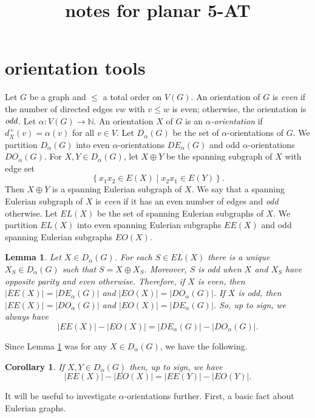 \documentclass[12pt]{article}
\theoremstyle{plain}
\newtheorem{lem}[thm]{Lemma}
\newtheorem{cor}[thm]{Corollary}
\theoremstyle{definition}
\theoremstyle{remark}
\newcommand{\IN}{\mathbb{N}}
\newcommand{\setb}[3]{\left\{ #1 \in #2 \mid #3 \right\}}
\newcommand{\func}[3]{#1\colon #2 \rightarrow #3}
\begin{document}
\title{notes for planar 5-AT}
\author{}
\maketitle

\section{orientation tools}
Let $G$ be a graph and $\le$ a total order on $V(G)$.  
An orientation of $G$ is \emph{even} if the number of directed edges $vw$ with $v \le w$ is even; otherwise, the orientation is $\emph{odd}$.
Let $\func{\alpha}{V(G)}{\IN}$.  An orientation $X$ of $G$ is an \emph{$\alpha$-orientation} if $d_X^+(v) = \alpha(v)$ for all $v \in V$.  Let $D_\alpha(G)$ be the set
of $\alpha$-orientations of $G$.  We partition $D_\alpha(G)$ into even $\alpha$-orientations $DE_\alpha(G)$ and odd $\alpha$-orientations $DO_\alpha(G)$.  
For $X, Y \in D_\alpha(G)$, let $X \oplus Y$ be the spanning subgraph of $X$ with edge set 
\[\setb{x_1x_2}{E(X)}{x_2x_1 \in E(Y)}.\]
Then $X \oplus Y$ is a spanning Eulerian subgraph of $X$.  We say that a spanning Eulerian subgraph of $X$ is \emph{even} if it has an even number of edges and \emph{odd} otherwise.  
Let $EL(X)$ be the set of spanning Eulerian subgraphs of $X$.  We partition $EL(X)$ into even spanning Eulerian subgraphs $EE(X)$ and odd spanning Eulerian subgraphs $EO(X)$.  

\begin{lem}\label{EulerianDifferenceIsEvenOddDifference}
	Let $X \in D_\alpha(G)$.  For each $S \in EL(X)$ there is a unique $X_S \in D_\alpha(G)$ such that $S = X \oplus X_S$.  Moreover, $S$ is odd when $X$ and $X_S$ have opposite parity and even otherwise.
	Therefore, if $X$ is even, then $|EE(X)| = |DE_\alpha(G)|$ and $|EO(X)| = |DO_\alpha(G)|$.  If $X$ is odd, then $|EE(X)| = |DO_\alpha(G)|$ and $|EO(X)| = |DE_\alpha(G)|$.  
	So, up to sign, we always have
	\[|EE(X)| - |EO(X)| = |DE_\alpha(G)| - |DO_\alpha(G)|.\]
\end{lem}

Since Lemma \ref{EulerianDifferenceIsEvenOddDifference} was for any $X \in D_\alpha(G)$, we have the following.
\begin{cor}\label{AlphaOrientationsSameEulerian}
	If $X, Y \in D_\alpha(G)$ then, up to sign, we have	
	\[|EE(X)| - |EO(X)| = |EE(Y)| - |EO(Y)|.\]
\end{cor}

It will be useful to investigate $\alpha$-orientations further.  First, a basic fact about Eulerian graphs.
\end{document}
